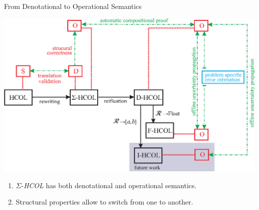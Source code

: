 \documentclass[aspectratio=169]{beamer}
\newcommand{\SHCOL}{\texorpdfstring{$\Sigma$-\emph{HCOL}}{Sigma-HCOL}}
\begin{document}
\begin{frame}{From Denotational to Operational Semantics}
  \begin{center}
    \includegraphics[width=0.8\columnwidth]{figures/semantics.eps}
  \end{center}
  
  \begin{enumerate}
  \item {\SHCOL} has both denotational and operational semantics.
  \item Structural properties allow to switch from one to another.
  \end{enumerate}
  
\end{frame}
\end{document}

